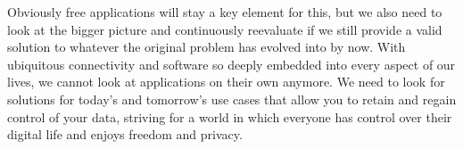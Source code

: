 Obviously free applications will stay a key element for this, but we also need to look at the bigger picture and continuously reevaluate if we still provide a valid solution to whatever the original problem has evolved into by now. With ubiquitous connectivity and software so deeply embedded into every aspect of our lives, we cannot look at applications on their own anymore. We need to look for solutions for today's and tomorrow's use cases that allow you to retain and regain control of your data, striving for a world in which everyone has control over their digital life and enjoys freedom and privacy.

